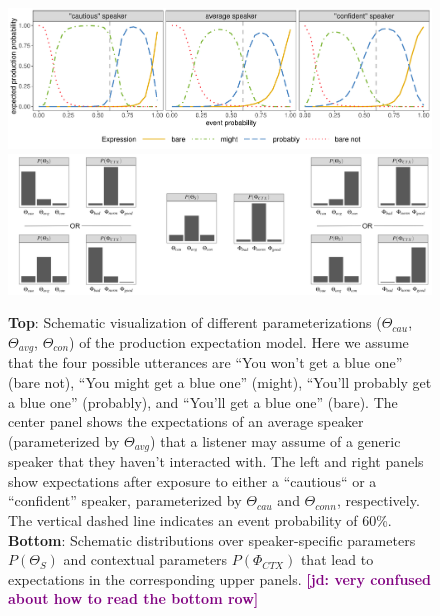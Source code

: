 \documentclass[man,floatsintext]{apa6}
\newcommand{\jd}[1]{\textcolor{Purple}{\bf [jd: #1]}}
\begin{document}
\begin{figure}[th!]
    \centering

    \includegraphics[width=\textwidth]{model-visualization-predictions.pdf}
     \includegraphics[width=\textwidth]{distribution-combinations.png}
    \caption{\textbf{Top}: Schematic visualization of different parameterizations ($\Theta_{cau}$, $\Theta_{avg}$, $\Theta_{con}$) of the production expectation model. Here we assume that the four possible utterances are ``You won't get a blue one'' (bare not), ``You might get a blue one'' (might), ``You'll probably get a blue one'' (probably), and ``You'll get a blue one'' (bare). The center panel shows the expectations of an average speaker (parameterized by $\Theta_{avg}$) that a listener may assume of a generic speaker that they haven't interacted with. The left and right panels show expectations after exposure to either a ``cautious`` or a ``confident'' speaker, parameterized by $\Theta_{cau}$ and $\Theta_{conn}$, respectively. The vertical dashed line indicates an event probability of 60\%. \\
    \textbf{Bottom}: Schematic distributions over speaker-specific parameters $P(\Theta_S)$ and contextual parameters $P(\Phi_{CTX})$ that lead to expectations in the corresponding upper panels. \jd{very confused about how to read the bottom row}}
    \label{fig:model-viz}
\end{figure}
\end{document}
